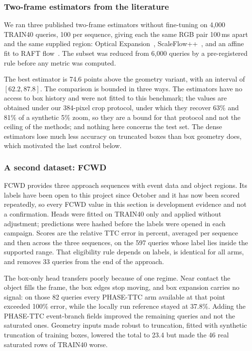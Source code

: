 \subsubsection{Two-frame estimators from the literature}
\label{sec:followup-literature}
We ran three published two-frame estimators without fine-tuning on 4,000 TRAIN40 queries, 100 per sequence, giving each the same RGB pair 100\,ms apart and the same supplied region: Optical Expansion~\cite{yang2020expansion}, ScaleFlow++~\cite{ling2024scaleflowpp}, and an affine fit to RAFT flow~\cite{teed2020raft}. The subset was reduced from 6,000 queries by a pre-registered rule before any metric was computed.



The best estimator is 74.6 points above the geometry variant, with an interval of $[62.2,87.8]$. The comparison is bounded in three ways. The estimators have no access to box history and were not fitted to this benchmark; the values are obtained under our 384-pixel crop protocol, under which they recover 63\% and 81\% of a synthetic 5\% zoom, so they are a bound for that protocol and not the ceiling of the methods; and nothing here concerns the test set. The dense estimators lose much less accuracy on truncated boxes than box geometry does, which motivated the last control below.

\subsubsection{A second dataset: FCWD}
\label{sec:followup-fcwd}
FCWD provides three approach sequences with event data and object regions. Its labels have been open to this project since October and it has now been scored repeatedly, so every FCWD value in this section is development evidence and not a confirmation. Heads were fitted on TRAIN40 only and applied without adjustment; predictions were hashed before the labels were opened in each campaign. Scores are the relative TTC error in percent, averaged per sequence and then across the three sequences, on the 597 queries whose label lies inside the supported range. That eligibility rule depends on labels, is identical for all arms, and removes 33 queries from the end of the approach.



The box-only head transfers poorly because of one regime. Near contact the object fills the frame, the box edges stop moving, and box expansion carries no signal: on those 82 queries every PHASE-TTC arm available at that point exceeded 100\% error, while the locally run reference stayed at 37.8\%. Adding the PHASE-TTC event-branch fields improved the remaining queries and not the saturated ones. Geometry inputs made robust to truncation, fitted with synthetic truncation of training boxes, lowered the total to 23.4 but made the 46 real saturated rows of TRAIN40 worse.

